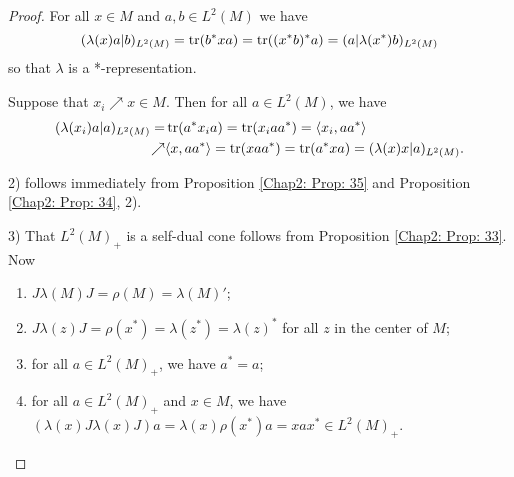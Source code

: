 \begin{proof}
    For all $x\in M$ and $a,b\in L^2(M)$ we have
    \[
        (\lambda(x)a|b)_{L^2(M)}=\tr(b^*xa)=\tr((x^*b)^*a)=(a|\lambda(x^*)b)_{L^2(M)}
    \]
    so that $\lambda$ is a *-representation.\par
    Suppose that $x_i\nearrow x\in M$. Then for all $a\in L^2 (M)$, we have
    \[
        \begin{split}
            (\lambda(x_i)a|a)_{L^2(M)}=&\tr(a^*x_ia)=\tr(x_iaa^*)=\langle x_i,aa^*\rangle\\
            \nearrow& \langle x,aa^*\rangle=\tr(xaa^*)=\tr(a^*xa)=(\lambda(x)x|a)_{L^2(M)}.
        \end{split}
    \]\par
    2) follows immediately from Proposition \ref{Chap2: Prop: 35} and Proposition \ref{Chap2: Prop: 34}, 2).\par
    3) That $L^2(M)_+$ is a self-dual cone follows from Proposition \ref{Chap2: Prop: 33}. Now
    \begin{enumerate}
        \item $J\lambda(M)J=\rho(M)=\lambda(M)'$;
        \item $J\lambda(z)J=\rho(x^*)=\lambda(z^*)=\lambda(z)^*$ for all $z$ in the center of $M$;
        \item for all $a\in L^2(M)_+$, we have $a^* = a$;
        \item for all $a\in L^2(M)_+$ and $x\in M$, we have $(\lambda(x)J\lambda(x)J)a=\lambda(x)\rho(x^*)a=xax^*\in L^2(M)_+$.
    \end{enumerate}
\end{proof}
